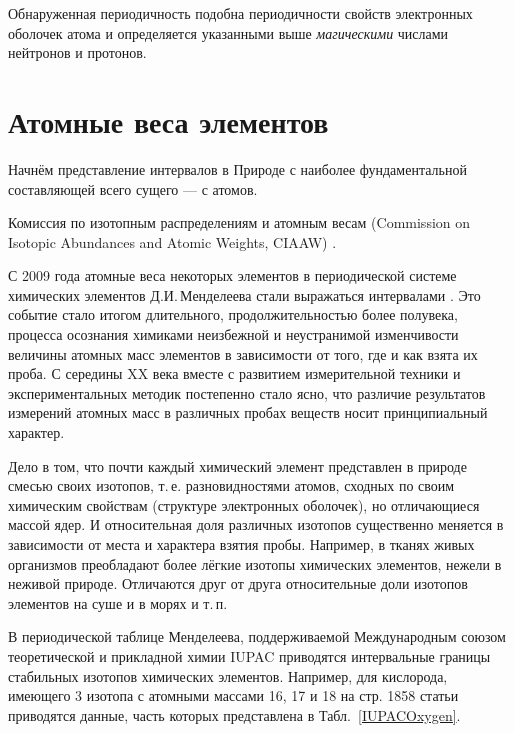 \documentclass[a5paper,openany]{book}
\begin{document}
Обнаруженная периодичность подобна периодичности свойств электронных оболочек атома и определяется указанными выше \emph{магическими} числами нейтронов и протонов.

\section{Атомные веса элементов}

Начнём представление интервалов в Природе с наиболее фундаментальной составляющей всего сущего --- с атомов.

Комиссия по изотопным распределениям и атомным весам (Commission on Isotopic Abundances and Atomic Weights, CIAAW) \cite{CIAAW}.

С 2009 года атомные веса некоторых элементов в периодической системе химических 
элементов Д.И.\,Менделеева стали выражаться интервалами \cite{IUPAC}. Это событие 
стало итогом длительного, продолжительностью более полувека, процесса осознания 
химиками неизбежной и неустранимой изменчивости величины атомных масс элементов 
в зависимости от того, где и как взята их проба. С середины XX века вместе 
с развитием измерительной техники и экспериментальных методик постепенно стало ясно, 
что различие результатов измерений атомных масс в различных пробах веществ носит 
принципиальный характер. 

Дело в том, что почти каждый химический элемент представлен в природе смесью своих 
изотопов, т.\,е. разновидностями атомов, сходных по своим химическим свойствам 
(структуре электронных оболочек), но отличающиеся массой ядер. И относительная 
доля различных изотопов существенно меняется в зависимости от места и характера 
взятия пробы. Например, в тканях живых организмов преобладают более лёгкие изотопы 
химических элементов, нежели в неживой природе. Отличаются друг от друга 
относительные доли изотопов элементов на суше и в морях и т.\,п. 

В периодической таблице Менделеева, поддерживаемой Международным союзом теоретической 
и прикладной химии IUPAC приводятся интервальные границы стабильных изотопов химических 
элементов. Например, для кислорода, имеющего 3 изотопа с атомными массами 16, 17 и 18 
на стр. 1858 статьи \cite{IUPAC} приводятся данные, часть которых представлена 
в Табл.~\ref{IUPACOxygen}. 
\end{document}
